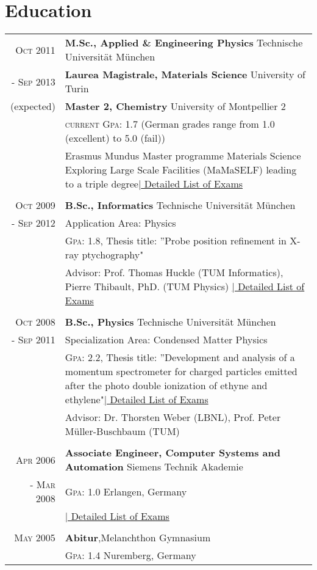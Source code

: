 \documentclass[a4paper,10pt]{article}
\begin{document}
\section{Education}
\begin{tabularx}{19cm}{rX}	

\textsc{Oct 2011}& \textbf{M.Sc., Applied \& Engineering Physics} \hfill{Technische Universität München}\\
\textsc{- Sep 2013} & \textbf{Laurea Magistrale, Materials Science} \hfill{University of Turin}\\
 (expected)&  \textbf{Master 2, Chemistry} \hfill{University of Montpellier 2}\\
 &  \textsc{current Gpa}: 1.7 (German grades range from 1.0 \small{(excellent)} to 5.0 \small{(fail)})\\& \small{Erasmus Mundus Master programme Materials Science Exploring Large Scale Facilities (MaMaSELF) leading to a
triple degree}\hyperlink{MSC}{\hfill |\footnotesize{ Detailed List of Exams}}\\\\

\textsc{Oct 2009}& \textbf{B.Sc., Informatics} \hfill{Technische Universität München}\\
\textsc{- Sep 2012} & Application Area: Physics\\
 & \textsc{Gpa}: 1.8, \small{Thesis title: ”Probe position refinement in X-ray ptychography"}\\
& Advisor: Prof. Thomas Huckle (TUM Informatics), Pierre Thibault, PhD. (TUM Physics)
\hyperlink{grds_studies}{\hfill |\footnotesize{ Detailed List of Exams}}
\\\\

\textsc{Oct 2008}& \textbf{B.Sc.,  Physics} \hfill\normalsize{Technische Universität München}\\
 \textsc{- Sep 2011}& Specialization Area: Condensed Matter Physics \\
& \textsc{Gpa}: 2.2, \small{Thesis title: ”Development and analysis of a momentum spectrometer for charged particles emitted after the photo double ionization of ethyne and ethylene"}\hyperlink{physicsBSC}{\hfill |\footnotesize{ Detailed List of Exams}}\\
& Advisor: Dr. Thorsten Weber (LBNL),  Prof. Peter Müller-Buschbaum (TUM) \\\\


\textsc{Apr 2006}& \textbf{Associate Engineer, Computer Systems and Automation} \hfill  {Siemens Technik Akademie}\\
\textsc{- Mar 2008}& \textsc{Gpa}: 1.0  \hfill Erlangen, Germany\\
 &\hyperlink{grds_siemens}{\hfill| \footnotesize Detailed List of Exams}\\ \\

\textsc{May} 2005& \textbf{Abitur},\hfill  Melanchthon Gymnasium \\
&  \textsc{Gpa}: 1.4 \hfill Nuremberg, Germany

\end{tabularx}
\end{document}
